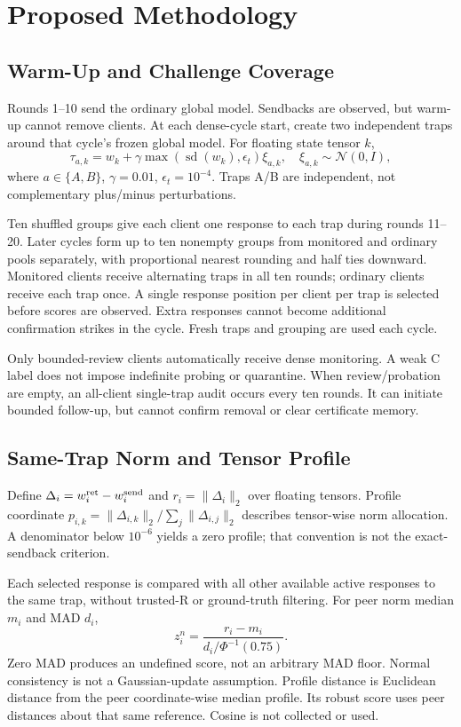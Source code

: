 \documentclass[conference]{IEEEtran}
\begin{document}
\section{Proposed Methodology}
\subsection{Warm-Up and Challenge Coverage}
Rounds 1--10 send the ordinary global model. Sendbacks are observed, but warm-up
cannot remove clients. At each dense-cycle start, create two independent traps
around that cycle's frozen global model. For floating state tensor $k$,
\begin{equation}
 \tau_{a,k}=w_k+\gamma\max(\operatorname{sd}(w_k),\epsilon_t)\xi_{a,k},
 \quad\xi_{a,k}\sim\mathcal N(0,I),
\end{equation}
where $a\in\{A,B\}$, $\gamma=0.01$, $\epsilon_t=10^{-4}$. Traps A/B are
independent, not complementary plus/minus perturbations.

Ten shuffled groups give each client one response to each trap during rounds
11--20. Later cycles form up to ten nonempty groups from monitored and ordinary
pools separately, with proportional nearest rounding and half ties downward.
Monitored clients receive alternating traps in all ten rounds; ordinary clients
receive each trap once. A single response position per client per trap is
selected before scores are observed. Extra responses cannot become additional
confirmation strikes in the cycle. Fresh traps and grouping are used each cycle.

Only bounded-review clients automatically receive dense monitoring. A weak C
label does not impose indefinite probing or quarantine. When review/probation
are empty, an all-client single-trap audit occurs every ten rounds. It can
initiate bounded follow-up, but cannot confirm removal or clear certificate
memory.

\subsection{Same-Trap Norm and Tensor Profile}
Define $\Delta_i=w_i^{\rm ret}-w_i^{\rm send}$ and $r_i=\|\Delta_i\|_2$ over
floating tensors. Profile coordinate
$p_{i,k}=\|\Delta_{i,k}\|_2/\sum_j\|\Delta_{i,j}\|_2$ describes tensor-wise
norm allocation. A denominator below $10^{-6}$ yields a zero profile; that
convention is not the exact-sendback criterion.

Each selected response is compared with all other available active responses
to the same trap, without trusted-R or ground-truth filtering. For peer norm
median $m_i$ and MAD $d_i$,
\begin{equation}
 z_i^n=\frac{r_i-m_i}{d_i/\Phi^{-1}(0.75)}.
\end{equation}
Zero MAD produces an undefined score, not an arbitrary MAD floor. Normal
consistency is not a Gaussian-update assumption. Profile distance is Euclidean
distance from the peer coordinate-wise median profile. Its robust score uses
peer distances about that same reference. Cosine is not collected or used.
\end{document}
